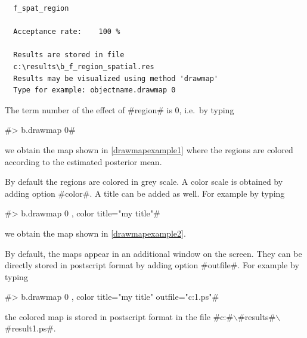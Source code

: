 \begin{verbatim}
  f_spat_region

  Acceptance rate:    100 %

  Results are stored in file
  c:\results\b_f_region_spatial.res
  Results may be visualized using method 'drawmap'
  Type for example: objectname.drawmap 0
\end{verbatim}

The term number of the effect of #region# is 0, i.e.~by typing

#> b.drawmap 0#

we obtain the map shown in \autoref{drawmapexample1} where the
regions are colored according to the estimated posterior mean.

By default the regions are colored in grey scale. A color scale is
obtained by adding option #color#. A title can be added as well.
For example by typing

#> b.drawmap 0 , color title="my title"#

we obtain the map shown in \autoref{drawmapexample2}.

By default, the maps appear in an additional window on the screen.
They can be directly stored in postscript format by adding option
#outfile#. For example by typing

 #> b.drawmap 0 , color title="my title" outfile="c:\results\result1.ps"#

the colored map is stored in postscript format in the file
#c:#$\backslash$#results#$\backslash$#result1.ps#.

